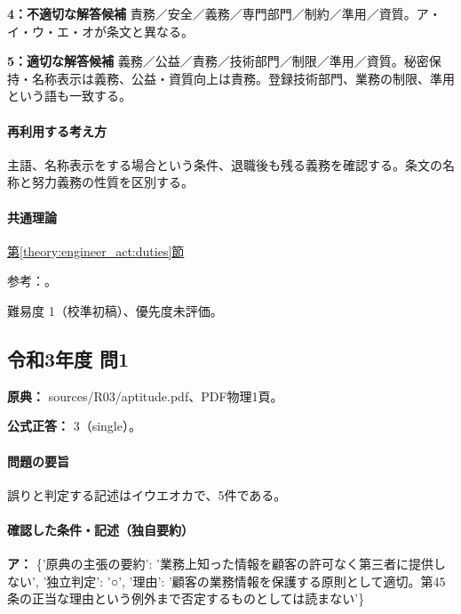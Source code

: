 \noindent\textbf{4：不適切な解答候補} 責務／安全／義務／専門部門／制約／準用／資質。ア・イ・ウ・エ・オが条文と異なる。\par

\noindent\textbf{5：適切な解答候補} 義務／公益／責務／技術部門／制限／準用／資質。秘密保持・名称表示は義務、公益・資質向上は責務。登録技術部門、業務の制限、準用という語も一致する。\par

\paragraph{再利用する考え方} 主語、名称表示をする場合という条件、退職後も残る義務を確認する。条文の名称と努力義務の性質を区別する。

\paragraph{共通理論} \hyperref[theory:engineer_act:duties]{第\ref*{theory:engineer_act:duties}節}

\par 参考：\cite{engineer_act_current}。

\par 難易度 1（校準初稿）、優先度未評価。

\subsection{令和3年度 問1}
\label{q:r03-reg-apt-01}

\noindent\textbf{原典：} sources/R03/aptitude.pdf、PDF物理1頁。

\textbf{公式正答：} 3（single）。

\paragraph{問題の要旨} 誤りと判定する記述はイウエオカで、5件である。

\paragraph{確認した条件・記述（独自要約）}\mbox{}\par

\noindent\textbf{ア：} \{'原典の主張の要約': '業務上知った情報を顧客の許可なく第三者に提供しない', '独立判定': '○', '理由': '顧客の業務情報を保護する原則として適切。第45条の正当な理由という例外まで否定するものとしては読まない'\}\par

